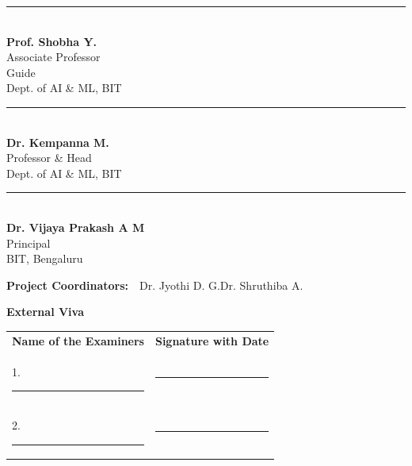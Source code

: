 \noindent
\begin{minipage}[t]{0.33\textwidth}\centering
\rule{0.86\textwidth}{0.5pt}\\[3pt]
{\fontsize{12}{15}\selectfont\bfseries Prof. Shobha Y.}\\
{\fontsize{11}{14}\selectfont Associate Professor}\\
{\fontsize{11}{14}\selectfont Guide}\\
{\fontsize{11}{14}\selectfont Dept. of AI \& ML, BIT}
\end{minipage}
\hfill
\begin{minipage}[t]{0.32\textwidth}\centering
\rule{0.86\textwidth}{0.5pt}\\[3pt]
{\fontsize{12}{15}\selectfont\bfseries Dr. Kempanna M.}\\
{\fontsize{11}{14}\selectfont Professor \& Head}\\
{\fontsize{11}{14}\selectfont Dept. of AI \& ML, BIT}
\end{minipage}
\hfill
\begin{minipage}[t]{0.31\textwidth}\centering
\rule{0.86\textwidth}{0.5pt}\\[3pt]
{\fontsize{12}{15}\selectfont\bfseries Dr. Vijaya Prakash A M}\\
{\fontsize{11}{14}\selectfont Principal}\\
{\fontsize{11}{14}\selectfont BIT, Bengaluru}
\end{minipage}

\vspace{12pt}

\noindent
{\fontsize{12}{15}\selectfont\bfseries Project Coordinators:}\ \
{\fontsize{12}{15}\selectfont Dr. Jyothi D. G.\quad\textbar\quad Dr. Shruthiba A.}

\vspace{10pt}

\noindent
{\fontsize{12}{15}\selectfont\bfseries External Viva}

\vspace{4pt}

\noindent
{\begin{tabular}{@{}p{}p{}@{}}
\textbf{Name of the Examiners} & \textbf{Signature with Date} \\[13pt]
1.\ \rule{0.36\textwidth}{0.4pt} & \rule{0.42\textwidth}{0.4pt} \\[13pt]
2.\ \rule{0.36\textwidth}{0.4pt} & \rule{0.42\textwidth}{0.4pt} \\
\end{tabular}}
\endgroup
\clearpage
